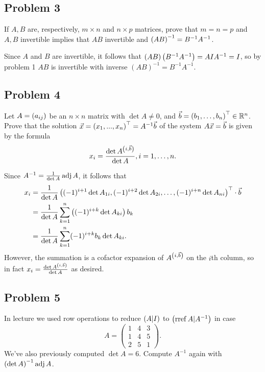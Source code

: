 \documentclass[main.tex]{subfiles}
\begin{document}
\subsection{Problem 3}
\begin{claim}
    If $A, B$ are, respectively, $m \times n$ and $n \times p$ matrices, prove that $m = n = p$ and $A, B$ invertible implies that $AB$ invertible and $\left( AB \right)^{-1} = B^{-1}A^{-1}$.
\end{claim}

\begin{soln}
    Since $A$ and $B$ are invertible, it follows that $(AB)\left( B^{-1}A^{-1} \right) = AIA^{-1} = I$, so by problem 1 $AB$ is invertible with inverse $(AB)^{-1} = B^{-1}A^{-1}$.
\end{soln}
\eject

\subsection{Problem 4}
\begin{claim}
     Let $A = \left( a_{ij} \right)$ be an $n \times n$ matrix with $\det A \neq 0$, and $\vec{b} = \left( b_1, \ldots , b_n \right)^\top \in \mathbb R^n$. Prove that the solution $\vec{x} = \left( x_1, . . . , x_n \right)^\top = A^{-1}\vec{b}$ of the system $A\vec{x} = \vec{b}$ is given by the formula
    \[x_i = \frac{\det A^{\left( i, \vec{b} \right)}}{\det A}, i = 1, \ldots , n .\]
\end{claim}

\begin{soln}
    Since $A^{-1} = \frac{1}{\det A}\operatorname{adj} A$, it follows that
    \begin{align*}
        x_i &= \frac{1}{\det A}\left( (-1)^{i + 1}\det A_{1i}, (-1)^{i + 2}\det A_{2i}, \ldots , (-1)^{i + n}\det A_{ni} \right)^\top \cdot \vec{b} \\
        &= \frac{1}{\det A}\sum_{k = 1}^n \left( (-1)^{i + k}\det A_{ki} \right)b_k \\
        &= \frac{1}{\det A}\sum_{k = 1}^n (-1)^{i + k}b_k\det A_{ki}.
    \end{align*}
    However, the summation is a cofactor expansion of $A^{\left( i, \vec{b} \right)}$ on the $i$th column, so in fact $x_i = \frac{\det A^{\left( i, \vec{b} \right)}}{\det A}$ as desired.
\end{soln}
\eject

\subsection{Problem 5}
\begin{claim}
    In lecture we used row operations to reduce $\left( A|I \right)$ to $\left( \operatorname{rref} A|A^{-1} \right)$ in case
    \[A = \begin{pmatrix}
        1 & 4 & 3 \\
        1 & 4 & 5 \\
        2 & 5 & 1
    \end{pmatrix}.\]
    We’ve also previously computed $\det A = 6$. Compute $A^{-1}$ again with $\left( \det A \right)^{-1} \operatorname{adj} A$.
\end{claim}
\end{document}
